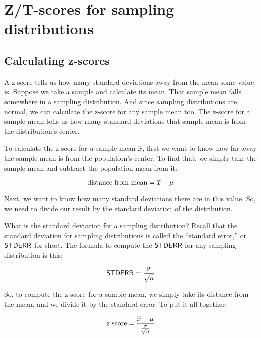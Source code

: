 \documentclass[../../../main.tex]{subfiles}
\begin{document}
\chapter{Z/T-scores for sampling distributions}



\section{Calculating z-scores}

A z-score tells us how many standard deviations away from the mean some value is. Suppose we take a sample and calculate its mean. That sample mean falls somewhere in a sampling distribution. And since sampling distributions are normal, we can calculate the z-score for any sample mean too. The z-score for a sample mean tells us how many standard deviations that sample mean is from the distribution's center.

To calculate the z-score for a sample mean $\overline{x}$, first we want to know how far away the sample mean is from the population's center. To find that, we simply take the sample mean and subtract the population mean from it:

\begin{equation*}
  \text{distance from mean} = \overline{x} - \mu
\end{equation*}

\noindent
Next, we want to know how many standard deviations there are in this value. So, we need to divide our result by the standard deviation of the distribution.

What is the standard deviation for a sampling distribution? Recall that the standard deviation for sampling distributions is called the ``standard error,'' or $\StdErr/$ for short. The formula to compute the $\StdErr/$ for any sampling distribution is this:

\begin{equation*}
  \StdErr/ = \frac{\populationstdev}{\sqrt{\samplesize/}}
\end{equation*}

\noindent
So, to compute the z-score for a sample mean, we simply take its distance from the mean, and we divide it by the standard error. To put it all together:

\begin{equation*}
  \text{z-score} = \frac{\samplemean{x} - \populationmean}{\frac{\populationstdev}{\sqrt{\samplesize/}}}
\end{equation*}
\end{document}
